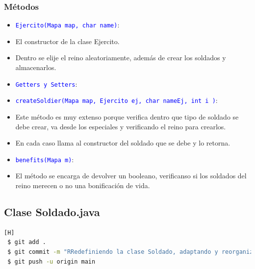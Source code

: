 \documentclass{article}
\begin{document}
\subsubsection{Métodos}
\begin{itemize}
    \item \texttt{\textcolor{blue}{Ejercito(Mapa map, char name)}}: 
    \item El constructor de la clase Ejercito.
    \item Dentro se elije el reino aleatoriamente, además de crear los soldados y almacenarlos.
\end{itemize}

\begin{itemize}
    \item \texttt{\textcolor{blue}{Getters y Setters}}: 
\end{itemize}

\begin{itemize}
    \item \texttt{\textcolor{blue}{createSoldier(Mapa map, Ejercito ej, char nameEj, int i )}}: 
    \item Este método es muy extenso porque verifica dentro que tipo de soldado se debe crear, va desde los especiales y verificando el reino para crearlos.
    \item En cada caso llama al constructor del soldado que se debe y lo retorna.
\end{itemize}

\newpage
\begin{itemize}
    \item \texttt{\textcolor{blue}{benefits(Mapa m)}}: 
    \item El método se encarga de devolver un booleano, verificanso si los soldados del reino merecen o no una bonificación de vida.
\end{itemize}



\newpage
\subsection{Clase Soldado.java}
\begin{lstlisting}[language=bash,caption={Commit \href{https://github.com/hernanchoquehuanca/fp2-23b/commit/87c06664db8bbb53d690bab28f87f8b52046ba41}{87c0666}: Redefiniendo la clase Soldado, adaptando y reorganizando su contenido}][H]
 $ git add .
 $ git commit -m "RRedefiniendo la clase Soldado, adaptando y reorganizando su contenido"			
 $ git push -u origin main
\end{lstlisting}
\end{document}
